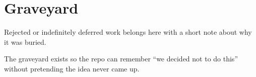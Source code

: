 \chapter{Graveyard}\label{record-424}

\smallskip

Rejected or indefinitely deferred work belongs here with a short note about why it was buried.

The graveyard exists so the repo can remember ``we decided not to do this'' without pretending the idea never came up.

